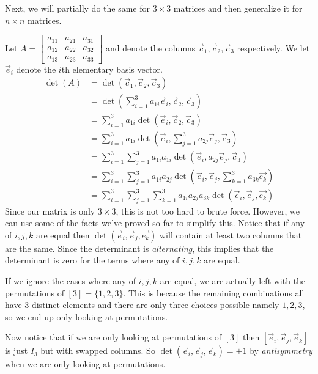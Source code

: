 Next, we will partially do the same for $3\times 3$ matrices and then generalize it for $n\times n$ matrices.
\begin{example}
    Let $A=\begin{bmatrix}
        a_{11} & a_{21} & a_{31}\\
        a_{12} & a_{22} & a_{32}\\
        a_{13} & a_{23} & a_{33}
    \end{bmatrix}$ and denote the columns $\vec{c}_1,\vec{c}_2,\vec{c}_3$ respectively. We let $\vec{e}_i$ denote the $i$th elementary basis vector.
    \begin{align*}
        \det(A)&=\det(\vec{c}_1,\vec{c}_2,\vec{c}_3)\\
        &=\det(\sum_{i=1}^3a_{1i}\vec{e}_i,\vec{c}_2,\vec{c}_3)\\
        &=\sum_{i=1}^3a_{1i}\det(\vec{e}_i,\vec{c}_2,\vec{c}_3)\tag{by Multilinearity}\\
        &=\sum_{i=1}^3a_{1i}\det(\vec{e}_i,\sum_{j=1}^3a_{2j}\vec{e}_j,\vec{c}_3)\\
        &=\sum_{i=1}^3\sum_{j=1}^3a_{1i}a_{1i}\det(\vec{e}_i,a_{2j}\vec{e}_j,\vec{c}_3)\tag{by Multilinearity}\\
        &=\sum_{i=1}^3\sum_{j=1}^3a_{1i}a_{2j}\det(\vec{e}_i,\vec{e}_j,\sum_{k=1}^3a_{3k}\vec{e_k})\\
        &=\sum_{i=1}^3\sum_{j=1}^3\sum_{k=1}^3a_{1i}a_{2j}a_{3k}\det(\vec{e}_i,\vec{e}_j,\vec{e_k})\tag{by Multilinearity}
    \end{align*}
    Since our matrix is only $3\times 3$, this is not too hard to brute force. However, we can use some of the facts we've proved so far to simplify this. Notice that if any of $i,j,k$ are equal then $\det(\vec{e}_i,\vec{e}_j,\vec{e_k})$ will contain at least two columns that are the same. Since the determinant is \textit{alternating}, this implies that the determinant is zero for the terms where any of $i,j,k$ are equal.

    If we ignore the cases where any of $i,j,k$ are equal, we are actually left with the permutations of $[3]=\{1,2,3\}$. This is because the remaining combinations all have $3$ distinct elements and there are only three choices possible namely $1,2,3$, so we end up only looking at permutations.

    Now notice that if we are only looking at permutations of $[3]$ then $[\vec{e}_i,\vec{e}_j,\vec{e}_k]$ is just $I_3$ but with swapped columns. So $\det(\vec{e}_i,\vec{e}_j,\vec{e}_k)=\pm 1$ by \textit{antisymmetry} when we are only looking at permutations.
\end{example}
